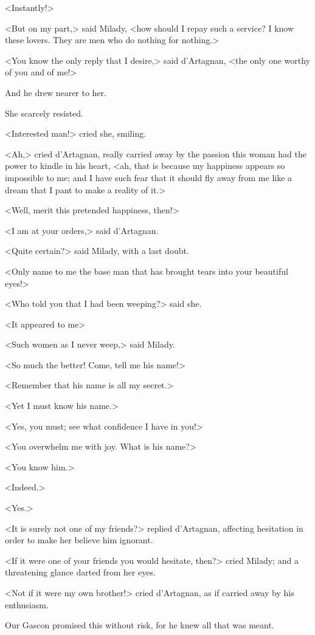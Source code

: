 <Instantly!> 

<But on my part,> said Milady, <how should I repay such a service? I know these lovers. They are men who do nothing for nothing.> 

<You know the only reply that I desire,> said d'Artagnan, <the only one worthy of you and of me!> 

And he drew nearer to her. 

She scarcely resisted. 

<Interested man!> cried she, smiling. 

<Ah,> cried d'Artagnan, really carried away by the passion this woman had the power to kindle in his heart, <ah, that is because my happiness appears so impossible to me; and I have such fear that it should fly away from me like a dream that I pant to make a reality of it.> 

<Well, merit this pretended happiness, then!> 

<I am at your orders,> said d'Artagnan. 

<Quite certain?> said Milady, with a last doubt. 

<Only name to me the base man that has brought tears into your beautiful eyes!> 

<Who told you that I had been weeping?> said she. 

<It appeared to me\longdash> 

<Such women as I never weep,> said Milady. 

<So much the better! Come, tell me his name!> 

<Remember that his name is all my secret.> 

<Yet I must know his name.> 

<Yes, you must; see what confidence I have in you!> 

<You overwhelm me with joy. What is his name?> 

<You know him.> 

<Indeed.> 

<Yes.> 

<It is surely not one of my friends?> replied d'Artagnan, affecting hesitation in order to make her believe him ignorant. 

<If it were one of your friends you would hesitate, then?> cried Milady; and a threatening glance darted from her eyes. 

<Not if it were my own brother!> cried d'Artagnan, as if carried away by his enthusiasm. 

Our Gascon promised this without risk, for he knew all that was meant. 

